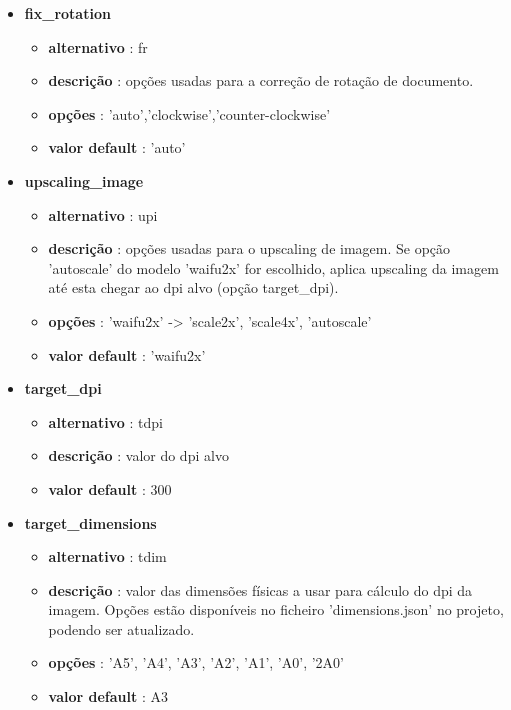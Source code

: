 \begin{itemize}
	\item \textbf{fix\_rotation}
		\begin{itemize}\setlength\itemsep{-0.5em}
			\item \textbf{alternativo} : fr
			\item \textbf{descrição} : opções usadas para a correção de rotação de documento.
			\item \textbf{opções} : 'auto','clockwise','counter-clockwise'
			\item \textbf{valor default} : 'auto'
		\end{itemize}
	
	\item \textbf{upscaling\_image}
		\begin{itemize}\setlength\itemsep{-0.5em}
			\item \textbf{alternativo} : upi
			\item \textbf{descrição} : opções usadas para o upscaling de imagem. Se opção 'autoscale' do modelo 'waifu2x' for escolhido, aplica upscaling da imagem até esta chegar ao dpi alvo (opção target\_dpi).
			\item \textbf{opções} : 'waifu2x' -> 'scale2x', 'scale4x', 'autoscale'
			\item \textbf{valor default} : 'waifu2x'
		\end{itemize}
	
	\item \textbf{target\_dpi}
		\begin{itemize}\setlength\itemsep{-0.5em}
			\item \textbf{alternativo} : tdpi
			\item \textbf{descrição} : valor do dpi alvo
			\item \textbf{valor default} : 300
		\end{itemize}
	
	\item \textbf{target\_dimensions}
		\begin{itemize}\setlength\itemsep{-0.5em}
			\item \textbf{alternativo} : tdim
			\item \textbf{descrição} : valor das dimensões físicas a usar para cálculo do dpi da imagem. Opções estão disponíveis no ficheiro 'dimensions.json' no projeto, podendo ser atualizado.
			\item \textbf{opções} : 'A5', 'A4', 'A3', 'A2', 'A1', 'A0', '2A0'
			\item \textbf{valor default} : A3
		\end{itemize}
	

\end{itemize}
